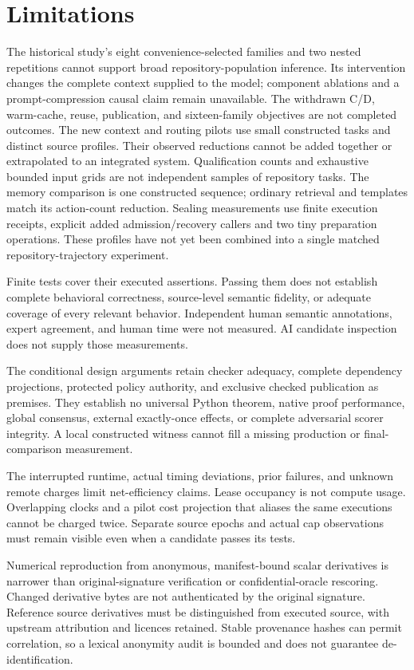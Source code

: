 \section{Limitations}
\label{sec:limitations}

The historical study's eight convenience-selected families and two nested
repetitions cannot support broad repository-population inference. Its
intervention changes the complete
context supplied to the model; component ablations and a prompt-compression
causal claim remain unavailable. The withdrawn C/D, warm-cache, reuse,
publication, and sixteen-family objectives are not completed outcomes.
The new context and routing pilots use small constructed tasks and distinct
source profiles. Their observed reductions cannot be added together or
extrapolated to an integrated system. Qualification counts and exhaustive
bounded input grids are not independent samples of repository tasks.
The memory comparison is one constructed sequence; ordinary retrieval and
templates match its action-count reduction. Sealing measurements use finite
execution receipts, explicit added admission/recovery callers and two tiny
preparation operations. These profiles have not yet been combined into a
single matched repository-trajectory experiment.

Finite tests cover their executed assertions. Passing them does not establish
complete behavioral correctness, source-level semantic fidelity, or adequate
coverage of every relevant behavior. Independent human semantic annotations,
expert agreement, and human time were not measured. AI candidate inspection
does not supply those measurements.

The conditional design arguments retain checker adequacy, complete dependency
projections, protected policy authority, and exclusive checked publication as
premises. They establish no universal Python theorem, native proof performance,
global consensus, external exactly-once effects, or complete adversarial scorer
integrity. A local constructed witness cannot fill a missing production or
final-comparison measurement.

The interrupted runtime, actual timing deviations, prior failures, and unknown
remote charges limit net-efficiency claims. Lease occupancy is not compute
usage. Overlapping clocks and a pilot cost projection that aliases the same
executions cannot be charged twice. Separate source epochs and actual cap
observations must remain visible even when a candidate passes its tests.

Numerical reproduction from anonymous, manifest-bound scalar derivatives is
narrower than original-signature verification or confidential-oracle rescoring.
Changed derivative bytes are not authenticated by the original signature.
Reference source derivatives must be distinguished from executed source, with
upstream attribution and licences retained. Stable provenance hashes can permit
correlation, so a lexical anonymity audit is bounded and does not guarantee
de-identification.
